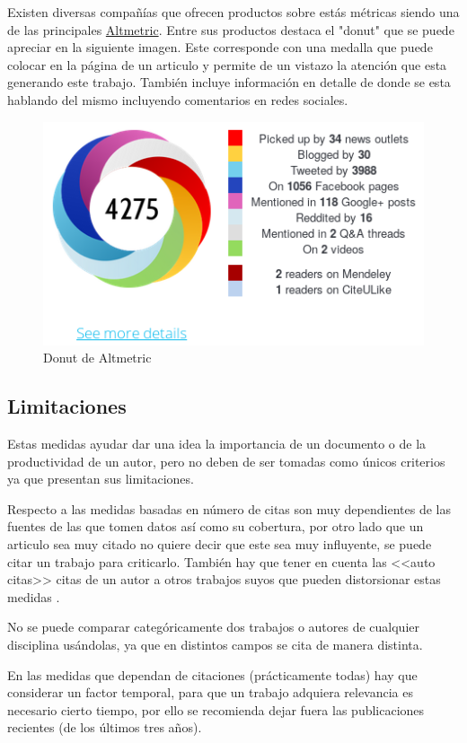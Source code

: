 Existen diversas compañías que ofrecen productos sobre estás métricas siendo una de las principales \href{https://www.altmetric.com/}{Altmetric}. Entre sus productos destaca el "donut" que se puede apreciar en la siguiente imagen. Este corresponde con una medalla que puede colocar en la página de un articulo y permite de un vistazo la atención que esta generando este trabajo. También incluye información en detalle de donde se esta hablando del mismo incluyendo comentarios en redes sociales.

\begin{figure}[h]
	
	\centering
	\includegraphics[width=0.7\linewidth]{imagenes/altmetrics_donough}
	\caption{Donut de Altmetric}
	\label{fig:altmetricsdonough}
\end{figure}


\subsection{Limitaciones}
Estas medidas ayudar dar una idea la importancia de un documento o de la productividad de un autor, pero no deben de ser tomadas como únicos criterios ya que presentan sus limitaciones.

Respecto a las medidas basadas en número de citas son muy dependientes de las fuentes de las que tomen datos así como su cobertura, por otro lado que un articulo sea muy citado no quiere decir que este sea muy influyente, se puede citar un trabajo para criticarlo. También hay que tener en cuenta las <<auto citas>> citas de un autor a otros trabajos suyos que pueden distorsionar estas medidas \cite{BibliometricWhitePaper}.

No se puede comparar categóricamente dos trabajos o autores de cualquier disciplina usándolas, ya que en distintos campos se cita de manera distinta. 

En las medidas que dependan de citaciones (prácticamente todas) hay que considerar un factor temporal, para que un trabajo adquiera relevancia es necesario cierto tiempo, por ello se recomienda dejar fuera las publicaciones recientes (de los últimos tres años)\cite{BibliometricWhitePaper}.


